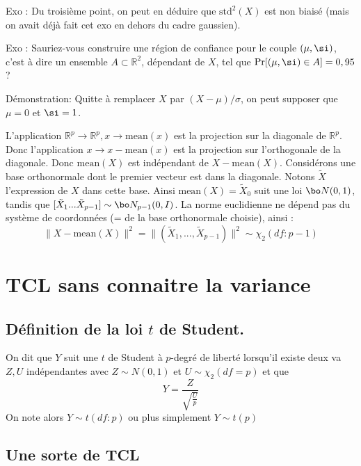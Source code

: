 \documentclass{article}
\def\std{\text{std}}
\def\mean{\mathrm{mean}}
\begin{document}
 Exo : Du troisième point, on peut en déduire que $\std^2(X)$ est non biaisé (mais on avait déjà fait cet exo en dehors du cadre gaussien). 
 
 Exo : Sauriez-vous construire une région de confiance pour le couple $(\mu,\si)$, c'est à dire un ensemble  $A\subset \mathbb R^2$, dépendant de $X$, tel que $\Pr[(\mu,\si)\in A] = 0,95$ ?  
 
 Démonstration: Quitte à remplacer $X$ par $(X-\mu)/\sigma$, on peut supposer que $\mu=0$ et $\si=1$.  
 
 L'application $\mathbb R^p\to \mathbb R^p,  x\to \mean(x)$ est la projection  sur la diagonale de $\mathbb R^p$. Donc l'application $x\to x-\mean(x)$ est la projection  sur  l'orthogonale de la diagonale.    
  Donc  $\mean(X)$ est indépendant de $X-\mean(X)$.   Considérons une base orthonormale dont le premier vecteur est dans la diagonale.  Notons $\tilde X$    l'expression de $X$ dans cette base.  Ainsi $\mathrm{mean}(X) = \tilde X_0$ suit une loi $\bo N(0,1)$, tandis que $[\tilde X_{1}... \tilde X_{p-1}]  \sim \bo N_{p-1}(0,I)$. La norme euclidienne ne dépend pas du système de coordonnées (= de la base orthonormale choisie), ainsi  :  
$$
\| X-\mean(X)\|^2 = \| (\tilde X_1,...,\tilde X_{p-1})\|^2    \sim \chi_2(df:p-1)
$$
 \carre
 
 
 
 
 


\section{TCL sans connaitre la variance}


\subsection{Définition de la loi $t$ de Student.}



On dit que $Y$ suit une $t$ de Student à $p$-degré de liberté lorsqu'il existe deux va $Z,U$  indépendantes avec $Z \sim N(0,1)$  et $U \sim \chi_2(df=p)$   et que    
$$
Y= \frac Z  {\sqrt{\frac U p }} 
$$
On note alors $Y \sim t(df:p)$ ou plus simplement $Y \sim t(p)$




\subsection{Une sorte de TCL}
\end{document}
